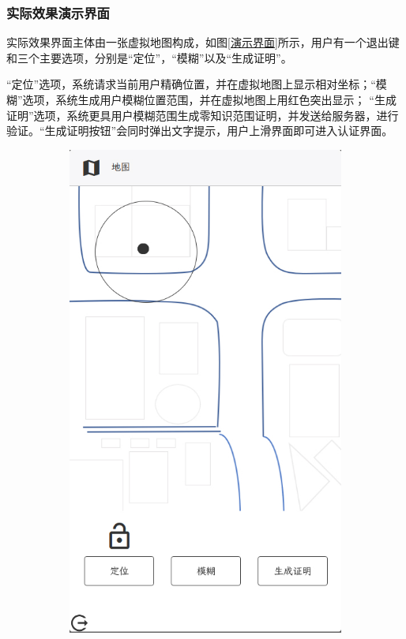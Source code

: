 \documentclass[zihao=-4]{ctexart}
\begin{document}
\subsubsection{实际效果演示界面}
实际效果界面主体由一张虚拟地图构成，如图\ref{演示界面}所示，用户有一个退出键和三个主要选项，分别是“定位”，“模糊”以及“生成证明”。
\par
“定位”选项，系统请求当前用户精确位置，并在虚拟地图上显示相对坐标；“模糊”选项，系统生成用户模糊位置范围，并在虚拟地图上用红色突出显示；
“生成证明”选项，系统更具用户模糊范围生成零知识范围证明，并发送给服务器，进行验证。“生成证明按钮”会同时弹出文字提示，用户上滑界面即可进入认证界面。
\begin{figure}[htbp]
  \begin{subfigure}{0.31\textwidth}
    \includegraphics[width=\linewidth]{前端-定位.jpg}

\end{subfigure}
\end{figure}
\end{document}
